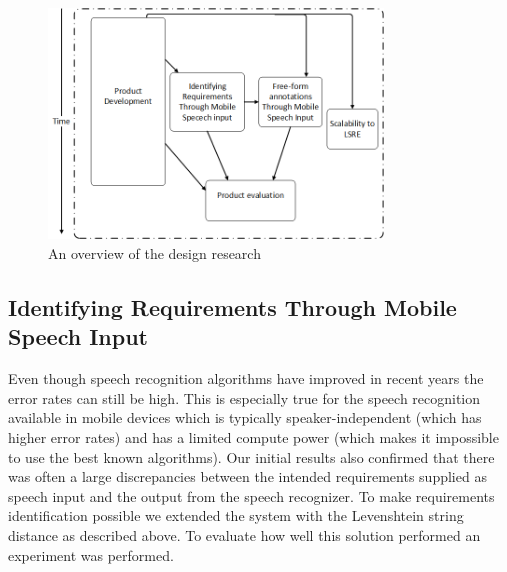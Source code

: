 \documentclass[conference]{IEEEtran}
\begin{document}


\begin{figure}[!t]
\centering
\includegraphics[width=3.5in]{pdf/researchove.png}
\caption{An overview of the design research}
\label{fig:resov}
\end{figure}

\subsection{Identifying Requirements Through Mobile Speech Input}

Even though speech recognition algorithms have improved in recent years the error rates can still be high.
This is especially true for the speech recognition available in mobile devices which is typically speaker-independent (which has higher error rates) and has a limited compute power (which makes it impossible to use the best known algorithms).
Our initial results also confirmed that there was often a large discrepancies between the intended requirements supplied as speech input and the output from the speech recognizer.
To make requirements identification possible we extended the system with the Levenshtein string distance as described above.
To evaluate how well this solution performed an experiment was performed.
\end{document}
